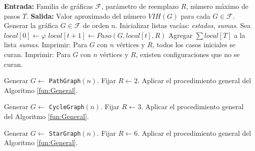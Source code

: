 \documentclass[12pt,titlepage,twoside,openright]{book}
\begin{document}
\newpage
\begin{algorithm}[h]
\caption{C\'alculo del n\'umero VIH(G) para una familia de gr\'aficas}
\label{fun:General}
\begin{algorithmic}[1]
\State \textbf{Entrada:} Familia de gr\'aficas $\mathcal{F}$, par\'ametro de reemplazo $R$, n\'umero m\'aximo de pasos $T$.
\State \textbf{Salida:} Valor aproximado del n\'umero $VIH(G)$ para cada $G \in \mathcal{F}$.
    \State Generar la gr\'afica $G \in \mathcal{F}$ de orden $n$.
    \State Inicializar listas vac\'ias: \textit{estados}, \textit{sumas}.
        \State Sea $local[0] \gets \varphi$
            \State $local[t+1] \gets Paso(G, local[t], R)$
        \EndFor
        \State Agregar $\sum local[T]$ a la lista \textit{sumas}.
    \EndFor
        \State Imprimir: Para $G$ con $n$ v\'ertices y $R$, todos los casos iniciales se curan.
    \Else
        \State Imprimir: Para $G$ con $n$ v\'ertices y $R$, existen configuraciones que no se curan.
    \EndIf
\EndFor
\end{algorithmic}
\end{algorithm}
\begin{algorithm}[H]
\caption{C\'alculo de $VIH(P_n)$}
\label{fun:VIH(Pn)}
\begin{algorithmic}[1]
    \State Generar $G \gets$ \texttt{PathGraph}$(n)$.
    \State Fijar $R \gets 2$.
    \State Aplicar el procedimiento general del Algoritmo \ref{fun:General}.
\EndFor
\end{algorithmic}
\end{algorithm}
\begin{algorithm}[H]
\caption{C\'alculo de $VIH(C_n)$}
\label{fun:VIH(Cn)}
\begin{algorithmic}[1]
    \State Generar $G \gets$ \texttt{CycleGraph}$(n)$.
    \State Fijar $R \gets 3$.
    \State Aplicar el procedimiento general del Algoritmo \ref{fun:General}.
\EndFor
\end{algorithmic}
\end{algorithm}
\newpage
\begin{algorithm}[H]
\caption{C\'alculo de $VIH(S_n)$}
\label{fun:VIH(Sn)}
\begin{algorithmic}[1]
    \State Generar $G \gets$ \texttt{StarGraph}$(n)$.
    \State Fijar $R \gets 6$.
    \State Aplicar el procedimiento general del Algoritmo \ref{fun:General}.
\EndFor
\end{algorithmic}
\end{algorithm}
\end{document}
